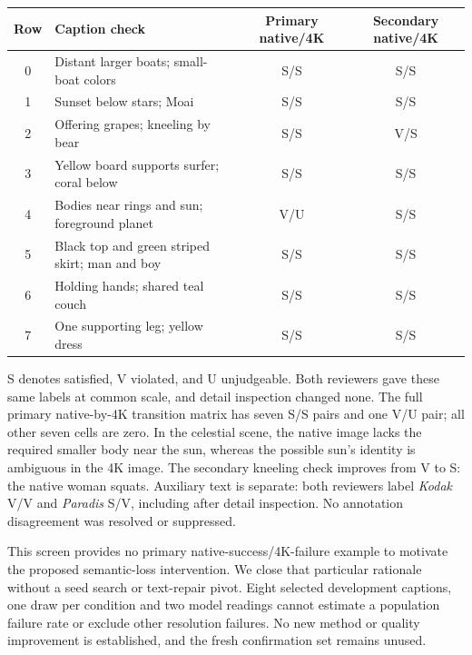 \begin{center}
\small
\begin{tabular}{clcc}
\toprule
Row & Caption check & Primary native/4K & Secondary native/4K \\
\midrule
0 & Distant larger boats; small-boat colors & S/S & S/S \\
1 & Sunset below stars; Moai & S/S & S/S \\
2 & Offering grapes; kneeling by bear & S/S & V/S \\
3 & Yellow board supports surfer; coral below & S/S & S/S \\
4 & Bodies near rings and sun; foreground planet & V/U & S/S \\
5 & Black top and green striped skirt; man and boy & S/S & S/S \\
6 & Holding hands; shared teal couch & S/S & S/S \\
7 & One supporting leg; yellow dress & S/S & S/S \\
\bottomrule
\end{tabular}
\end{center}
S denotes satisfied, V violated, and U unjudgeable. Both reviewers gave these
same labels at common scale, and detail inspection changed none. The full
primary native-by-4K transition matrix has seven S/S pairs and one V/U pair;
all other seven cells are zero. In the celestial scene, the native image lacks
the required smaller body near the sun, whereas the possible sun's identity is
ambiguous in the 4K image. The secondary kneeling check improves from V to S:
the native woman squats. Auxiliary text is separate: both reviewers label
\emph{Kodak} V/V and \emph{Paradis} S/V, including after detail inspection.
No annotation disagreement was resolved or suppressed.

This screen provides no primary native-success/4K-failure example to motivate
the proposed semantic-loss intervention. We close that particular rationale
without a seed search or text-repair pivot. Eight selected development captions,
one draw per condition and two model readings cannot estimate a population
failure rate or exclude other resolution failures. No new method or quality
improvement is established, and the fresh confirmation set remains unused.

